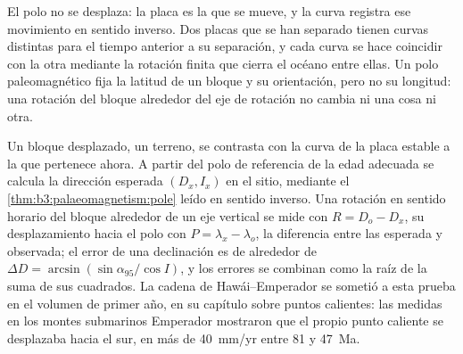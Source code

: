 El polo no se desplaza: la placa es la que se mueve, y la curva registra ese movimiento
en sentido inverso. Dos placas que se han separado tienen curvas distintas para el tiempo
anterior a su separación, y cada curva se hace coincidir con la otra mediante la
rotación finita que cierra el océano entre ellas. Un polo paleomagnético fija la
latitud de un bloque y su orientación, pero no su longitud: una rotación del
bloque alrededor del eje de rotación no cambia ni una cosa ni otra.

Un bloque desplazado, un terreno, se contrasta con la curva de la placa estable a la que
pertenece ahora. A partir del polo de referencia de la edad adecuada se calcula la
dirección esperada $(D_x, I_x)$ en el sitio, mediante el \cref{thm:b3:palaeomagnetism:pole}
leído en sentido inverso. Una rotación en sentido horario del bloque alrededor de un eje vertical
se mide con $R = D_o - D_x$, su desplazamiento hacia el polo con $P = \lambda_x -
\lambda_o$, la diferencia entre las  esperada y observada; el
error de una declinación es de alrededor de $\Delta D = \arcsin(\sin\alpha_{95}/\cos I)$,
y los errores se combinan como la raíz de la suma de sus cuadrados. La cadena de Hawái--Emperador
se sometió a esta prueba en el volumen de primer año, en su capítulo sobre puntos calientes:
las  medidas en los montes submarinos Emperador mostraron que el propio punto caliente
se desplazaba hacia el sur, en más de \qty{40}{mm/yr} entre 81 y \qty{47}{Ma}.

